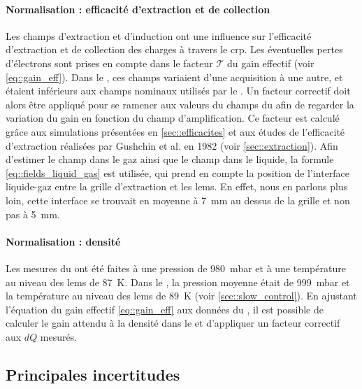         \paragraph{Normalisation : efficacité d'extraction et de collection} Les champs d'extraction et d'induction ont une influence sur l'efficacité d'extraction et de collection des charges à travers le \gls{crp}. Les éventuelles pertes d'électrons sont prises en compte dans le facteur $\mathcal{T}$ du gain effectif (voir \autoref{eq::gain_eff}). Dans le \TOO{}, ces champs variaient d'une acquisition à une autre, et étaient inférieurs aux champs nominaux utilisés par le \threeL{}. Un facteur correctif doit alors être appliqué pour se ramener aux valeurs du champs du \threeL{} afin de regarder la variation du gain en fonction du champ d'amplification. Ce facteur est calculé grâce aux simulations présentées en \autoref{sec::efficacites} et aux études de l'efficacité d'extraction réalisées par Gushchin et al. en 1982\cite{guschin} (voir \autoref{sec::extraction}). Afin d'estimer le champ dans le gaz ainsi que le champ dans le liquide, la formule \eqref{eq::fields_liquid_gas} est utilisée, qui prend en compte la position de l'interface liquide-gaz entre la grille d'extraction et les \glspl{lem}. En effet, nous en parlons plus loin, cette interface se trouvait en moyenne à \SI{7}{\milli\meter} au dessus de la grille et non pas à \SI{5}{\milli\meter}.

        \paragraph{Normalisation : densité} Les mesures du \threeL{} ont été faites à une pression de \SI{980}{\milli\bar} et à une température au niveau des \glspl{lem} de \SI{87}{\kelvin}. Dans le \TOO{}, la pression moyenne était de \SI{999}{\milli\bar} et la température au niveau des \glspl{lem} de \SI{89}{\kelvin} (voir \autoref{sec::slow_control}). En ajustant l'équation du gain effectif \eqref{eq::gain_eff} aux données du \threeL{}, il est possible de calculer le gain attendu à la densité dans le \TOO{} et d'appliquer un facteur correctif aux $dQ$ mesurés.

    \subsection{Principales incertitudes}\label{sec::uncertainties}

